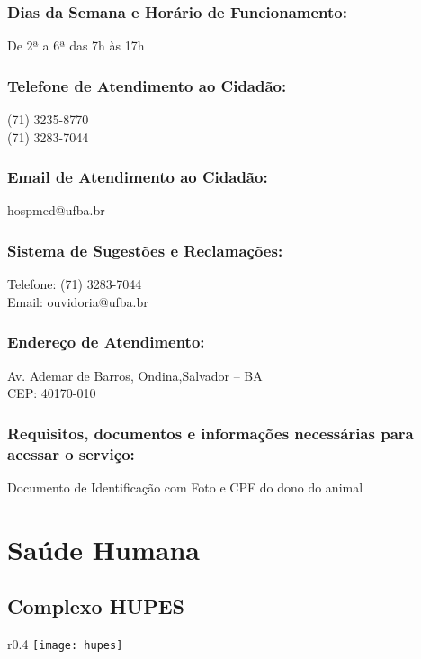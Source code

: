         \subsubsection{Dias da Semana e Horário de Funcionamento:}
            De 2ª a 6ª das 7h às 17h
    
        \subsubsection {Telefone de Atendimento ao Cidadão:}
            (71) 3235-8770 \\
            (71) 3283-7044

        \subsubsection{Email de Atendimento ao Cidadão:}
            hospmed@ufba.br
    
        \subsubsection{Sistema de Sugestões e Reclamações:}
            Telefone: (71) 3283-7044 \\
            Email: ouvidoria@ufba.br

        \subsubsection{Endereço de Atendimento:}
            Av. Ademar de Barros, Ondina,Salvador – BA \\
            CEP: 40170-010

        \subsubsection{Requisitos, documentos e informações necessárias para acessar o serviço:}
            Documento de Identificação com Foto e CPF do dono do animal
\section{Saúde Humana}
    \subsection{Complexo HUPES}
    
     \begin{wrapfigure}{r}{0.4\textwidth}
        \centering
        \texttt{[image: hupes]}
    \end{wrapfigure}
    
